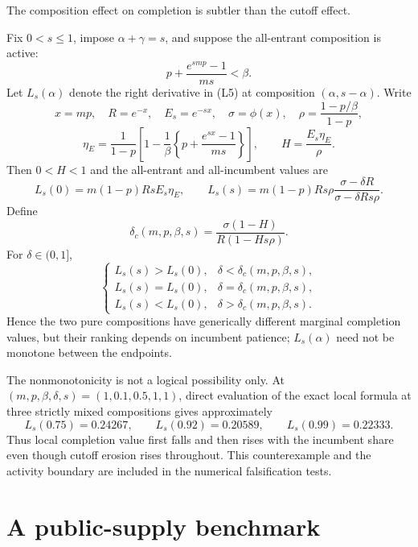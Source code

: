 \documentclass[mnsc,blindrev]{informs3}
\newcommand{\ph}{\phi}
\begin{document}
The composition effect on completion is subtler than the cutoff effect.

\begin{theorem}
\label{thm:compositionvalue}
Fix $0<s\le1$, impose $\alpha+\gamma=s$, and suppose the all-entrant
composition is active:
\[
 p+\frac{e^{smp}-1}{ms}<\beta.                            \tag{L20}
\]
Let $L_s(\alpha)$ denote the right derivative in (L5) at composition
$(\alpha,s-\alpha)$.  Write
\[
 x=mp,\quad R=e^{-x},\quad E_s=e^{-sx},\quad
 \sigma=\ph(x),\quad \rho=\frac{1-p/\beta}{1-p},
\]
\[
 \eta_E=\frac{1}{1-p}\left[
 1-\frac1\beta\left\{p+\frac{e^{sx}-1}{ms}\right\}
 \right],\qquad H=\frac{E_s\eta_E}{\rho}.                \tag{L21}
\]
Then $0<H<1$ and the all-entrant and all-incumbent values are
\[
 L_s(0)=m(1-p)RsE_s\eta_E,\qquad
 L_s(s)=m(1-p)Rs\rho
 \frac{\sigma-\delta R}{\sigma-\delta Rs\rho}.           \tag{L22}
\]
Define
\[
 \delta_c(m,p,\beta,s)=
 \frac{\sigma(1-H)}{R(1-Hs\rho)}.                        \tag{L23}
\]
For $\delta\in(0,1]$,
\[
\begin{cases}
 L_s(s)>L_s(0),&\delta<\delta_c(m,p,\beta,s),\\
 L_s(s)=L_s(0),&\delta=\delta_c(m,p,\beta,s),\\
 L_s(s)<L_s(0),&\delta>\delta_c(m,p,\beta,s).
\end{cases}                                               \tag{L24}
\]
Hence the two pure compositions have generically different marginal
completion values, but their ranking depends on incumbent patience;
$L_s(\alpha)$ need not be monotone between the endpoints.
\end{theorem}

The nonmonotonicity is not a logical possibility only.  At
$(m,p,\beta,\delta,s)=(1,0.1,0.5,1,1)$, direct evaluation of the exact local
formula at three strictly mixed compositions gives approximately
\[
 L_s(0.75)=0.24267,\qquad L_s(0.92)=0.20589,\qquad
 L_s(0.99)=0.22333.                                      \tag{L25}
\]
Thus local completion value first falls and then rises with the incumbent
share even though cutoff erosion rises throughout.  This counterexample and
the activity boundary are included in the numerical falsification tests.


\section{A public-supply benchmark}
\label{sec:publicN}
\end{document}

